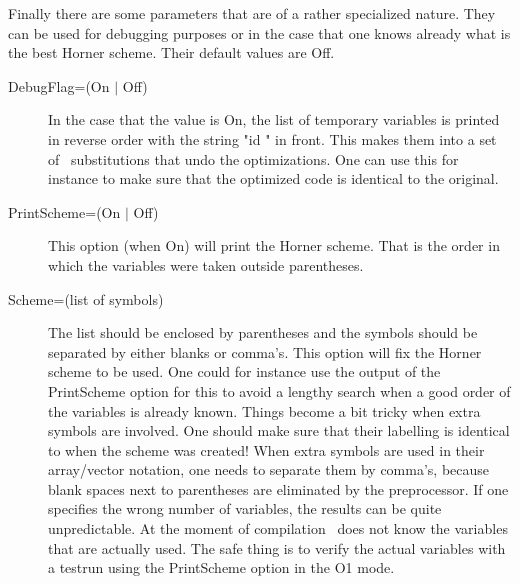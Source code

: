 Finally there are some parameters that are of a rather specialized nature. 
They can be used for debugging purposes or in the case 
that one knows already what is the best Horner scheme. Their default values 
are Off.

\begin{description}
\item[DebugFlag=(On $|$ Off)] \label{optimdebugflag}
In the case that the value is On, the list of temporary variables is 
printed in reverse order with the string "id " in front. This makes 
them into a set of \FORM\ substitutions that undo the optimizations. One 
can use this for instance to make sure that the optimized code is identical 
to the original.
\item[PrintScheme=(On $|$ Off)]
This option (when On) will print the Horner scheme. That is the order in 
which the variables were taken outside parentheses.
\item[Scheme=(list of symbols)] The list should be enclosed by parentheses 
and the symbols should be separated by either blanks or comma's. This 
option will fix the Horner scheme to be used. One 
could for instance use the output of the PrintScheme option for this to 
avoid a lengthy search when a good order of the variables is already known. 
Things become a bit tricky when extra symbols are involved. One should make 
sure that their labelling is identical to when the scheme was created! When 
extra symbols are used in their array/vector notation, one needs to 
separate them by comma's, because blank spaces next to parentheses are 
eliminated by the preprocessor. If one specifies the wrong number of 
variables, the results can be quite unpredictable. At the moment of 
compilation \FORM\ does not know the variables that are actually used. The 
safe thing is to verify the actual variables with a testrun using the 
PrintScheme option in the O1 mode.
\end{description}


